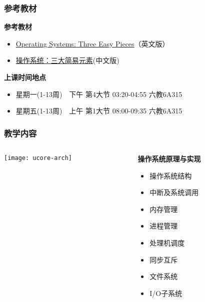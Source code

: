 \begin{frame}
	\frametitle{参考教材}
	
%		
			\textbf{参考教材}
			\begin{itemize}
                \item \href{https://pages.cs.wisc.edu/~remzi/OSTEP/}{Operating Systems: Three Easy Pieces}（英文版）
                \item \href{https://github.com/remzi-arpacidusseau/ostep-translations/tree/master/chinese#ostep-chinese-version}{操作系统：三大简易元素}(中文版)
			\end{itemize}
			\pause
		
			\textbf{上课时间地点}
			\begin{itemize}
				\item 星期一(1-13周)　下午 第4大节  03:20-04:55  六教6A315
				\item 星期五(1-13周)　上午 第1大节  08:00-09:35  六教6A315
		    \end{itemize}
%		
%			
%			
%		
	
\end{frame}

\begin{frame}
	\frametitle{教学内容}

	\begin{columns}

	\begin{column}{0.5\textwidth}
	
    \texttt{[image: ucore-arch]}
    
    \end{column}
	
	\begin{column}{0.5\textwidth}
	\textbf{操作系统原理与实现}
    \begin{itemize}
		\item 操作系统结构
		\item 中断及系统调用 %
		\item 内存管理
		\item 进程管理
		\item 处理机调度
		\item 同步互斥 %
		\item 文件系统
		\item I/O子系统
    \end{itemize}
    
    \end{column}

\end{columns}

\end{frame}

